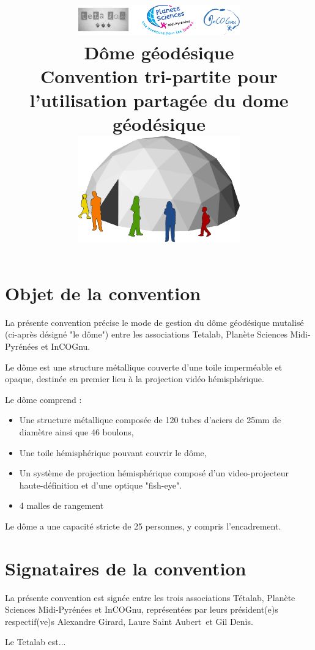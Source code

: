 \documentclass[a4paper,12pt]{article}
\title{
	\includegraphics[width=7cm]{logos.pdf}\\
	\vfill
	\LARGE{\textbf{Dôme géodésique}}\\[1cm]
	\large{Convention tri-partite pour l'utilisation partagée du dome géodésique}\\[1cm]
	\includegraphics[width=7cm]{general.pdf}\\
	\vfill
}
\newcommand{\presidentplasci}{Gil Denis}
\newcommand{\presidentincognu}{Laure Saint Aubert}
\newcommand{\presidenttetalab}{Alexandre Girard}
\begin{document}
\maketitle
\clearpage
\tableofcontents


\section{Objet de la convention}

La présente convention précise le mode de gestion du dôme géodésique mutalisé
(ci-après désigné "le dôme") entre les associations Tetalab, Planète Sciences
Midi-Pyrénées et InCOGnu.

Le dôme est une structure métallique couverte d'une toile imperméable et
opaque, destinée en premier lieu à la projection vidéo hémisphérique.

Le dôme comprend :

\begin{itemize}

	\item Une structure métallique composée de 120 tubes d'aciers
de 25mm de diamètre ainsi que 46 boulons,

	\item Une toile hémisphérique pouvant couvrir le dôme,

	\item Un système de projection hémisphérique composé d'un video-projecteur
	haute-définition et d'une optique "fish-eye".

	\item 4 malles de rangement

\end{itemize}


Le dôme a une capacité stricte de 25 personnes, y compris l'encadrement.

\section{Signataires de la convention}

La présente convention est signée entre les trois associations Tétalab, Planète
Sciences Midi-Pyrénées et InCOGnu, représentées par leurs président(e)s
respectif(ve)s \presidenttetalab, \presidentincognu~et \presidentplasci.

Le Tetalab est...
\end{document}
